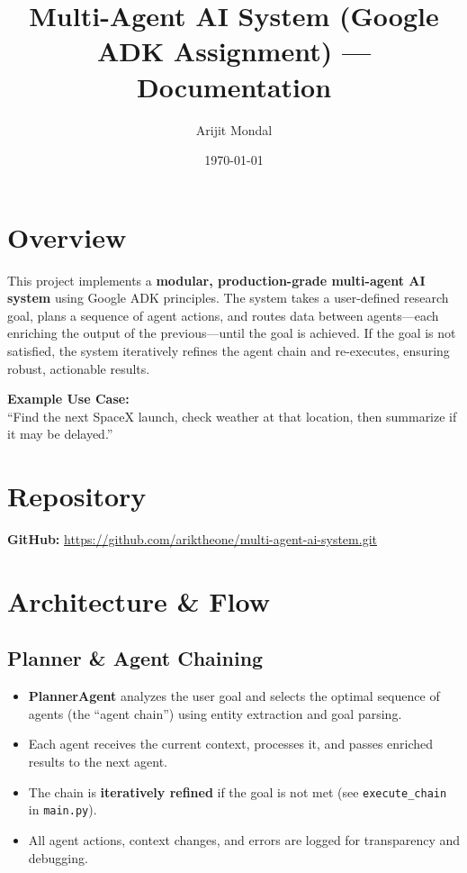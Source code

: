 \documentclass[12pt]{article}
\title{Multi-Agent AI System (Google ADK Assignment) --- Documentation}
\author{Arijit Mondal}
\date{\today}
\begin{document}
\maketitle

\tableofcontents
\newpage

\section{Overview}

This project implements a \textbf{modular, production-grade multi-agent AI system} using Google ADK principles. The system takes a user-defined research goal, plans a sequence of agent actions, and routes data between agents---each enriching the output of the previous---until the goal is achieved. If the goal is not satisfied, the system iteratively refines the agent chain and re-executes, ensuring robust, actionable results.

\textbf{Example Use Case:} \\
``Find the next SpaceX launch, check weather at that location, then summarize if it may be delayed.''

\section{Repository}

\textbf{GitHub:} \url{https://github.com/ariktheone/multi-agent-ai-system.git}

\section{Architecture \& Flow}

\subsection*{Planner \& Agent Chaining}
\begin{itemize}
    \item \textbf{PlannerAgent} analyzes the user goal and selects the optimal sequence of agents (the ``agent chain'') using entity extraction and goal parsing.
    \item Each agent receives the current context, processes it, and passes enriched results to the next agent.
    \item The chain is \textbf{iteratively refined} if the goal is not met (see \texttt{execute\_chain} in \texttt{main.py}).
    \item All agent actions, context changes, and errors are logged for transparency and debugging.
\end{itemize}
\end{document}
